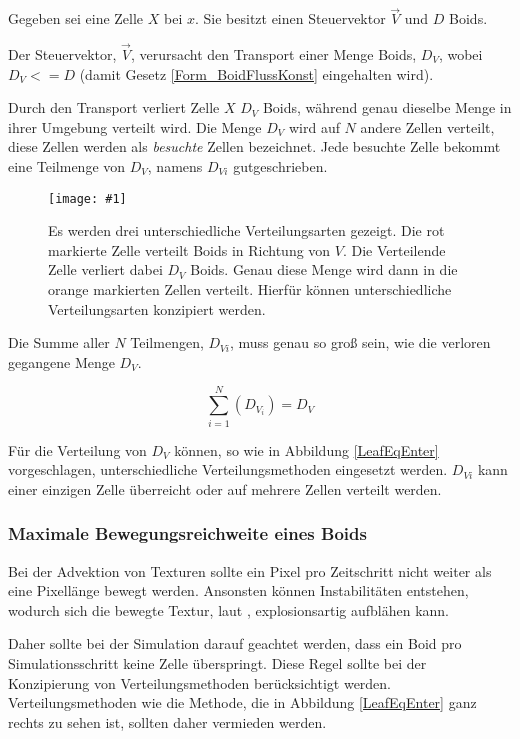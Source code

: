 \documentclass[a4paper, 10pt, journal]{wissarbIEEE}      %
\newcommand{\bild}[3]{
\begin{figure}[h]
\centering
  \texttt{[image: \#1]}
  \caption{#3}
  \label{#1}
\end{figure}}
\begin{document}
Gegeben sei eine Zelle $X$ bei $x$. Sie besitzt einen Steuervektor $\vec{V}$ und $D$ Boids.

Der Steuervektor, $\vec{V}$, verursacht den Transport einer Menge Boids, $D_V$, wobei \\ $D_V <= D$ (damit Gesetz \ref{Form_BoidFlussKonst} eingehalten wird).

Durch den Transport verliert Zelle $X$ $D_V$ Boids, während genau dieselbe Menge in ihrer Umgebung verteilt wird. Die Menge $D_V$ wird auf $N$ andere Zellen verteilt, diese Zellen werden als \textit{besuchte} Zellen bezeichnet. Jede besuchte Zelle bekommt eine Teilmenge von $D_V$, namens $D_{Vi}$ gutgeschrieben.

\bild{bilder/LeafEqEnter}{8.5cm}{Es werden drei unterschiedliche Verteilungsarten gezeigt. Die rot markierte Zelle verteilt Boids in Richtung von $V$. Die Verteilende Zelle verliert dabei $D_V$ Boids. Genau diese Menge wird dann in die orange markierten Zellen verteilt. Hierfür können unterschiedliche Verteilungsarten konzipiert werden.}

Die Summe aller $N$ Teilmengen, $D_{Vi}$, muss genau so groß sein, wie die verloren gegangene Menge $D_V$.

\begin{equation}
\sum_{i=1}^N(D_{V_i}) = D_V
\label{Form_SummeD_V_i}
\end{equation}

Für die Verteilung von $D_V$ können, so wie in Abbildung \ref{LeafEqEnter} vorgeschlagen, unterschiedliche Verteilungsmethoden eingesetzt werden. $D_{Vi}$ kann einer einzigen Zelle überreicht oder auf mehrere Zellen verteilt werden.



\subsubsection{Maximale Bewegungsreichweite eines Boids}

Bei der Advektion von Texturen sollte ein Pixel pro Zeitschritt nicht weiter als eine Pixellänge bewegt werden. Ansonsten können Instabilitäten entstehen, wodurch sich die bewegte Textur, laut \cite{GPUGems1}, explosionsartig aufblähen kann.

Daher sollte bei der Simulation darauf geachtet werden, dass ein Boid pro Simulationsschritt keine Zelle überspringt. Diese Regel sollte bei der Konzipierung von Verteilungsmethoden berücksichtigt werden. Verteilungsmethoden wie die Methode, die in Abbildung \ref{LeafEqEnter} ganz rechts zu sehen ist, sollten daher vermieden werden.
\end{document}
